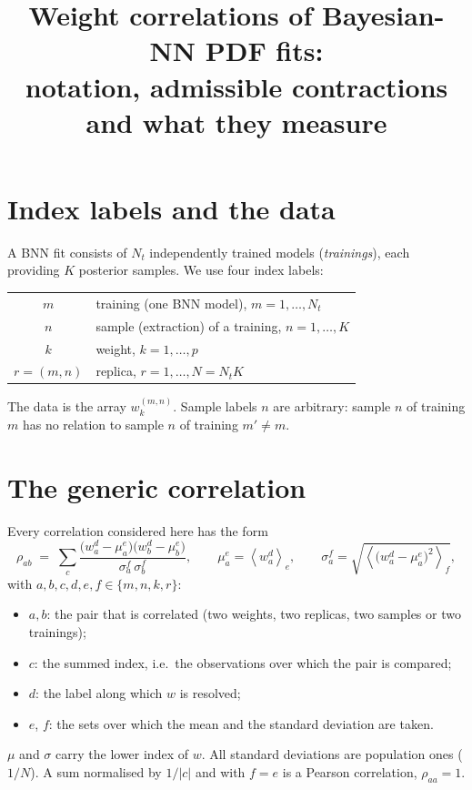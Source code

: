 \documentclass[11pt]{article}
\title{Weight correlations of Bayesian-NN PDF fits:\\ notation, admissible contractions and what they measure}
\author{}
\date{}
\newcommand{\avg}[2]{\left\langle #1 \right\rangle_{#2}}
\begin{document}
\maketitle

\section{Index labels and the data}
A BNN fit consists of $N_t$ independently trained models (\emph{trainings}), each providing $K$ posterior
samples. We use four index labels:
\begin{center}
\begin{tabular}{cl}
\toprule
$m$ & training (one BNN model), $m = 1,\dots,N_t$\\
$n$ & sample (extraction) of a training, $n = 1,\dots,K$\\
$k$ & weight, $k = 1,\dots,p$\\
$r = (m,n)$ & replica, $r = 1,\dots,N = N_t K$\\
\bottomrule
\end{tabular}
\end{center}
The data is the array $w_k^{(m,n)}$. Sample labels $n$ are arbitrary: sample $n$ of training $m$ has no
relation to sample $n$ of training $m' \neq m$.

\section{The generic correlation}
Every correlation considered here has the form
\begin{equation}
  \rho_{ab} \;=\; \sum_c \frac{\bigl(w_a^{d} - \mu_a^{e}\bigr)\bigl(w_b^{d} - \mu_b^{e}\bigr)}{\sigma_a^{f}\,\sigma_b^{f}},
  \qquad
  \mu_a^{e} = \avg{w_a^{d}}{e},\qquad
  \sigma_a^{f} = \sqrt{\avg{\bigl(w_a^{d}-\mu_a^{e}\bigr)^2}{f}},
  \label{eq:generic}
\end{equation}
with $a,b,c,d,e,f \in \{m,n,k,r\}$:
\begin{itemize}
  \item $a,b$: the pair that is correlated (two weights, two replicas, two samples or two trainings);
  \item $c$: the summed index, i.e.\ the observations over which the pair is compared;
  \item $d$: the label along which $w$ is resolved;
  \item $e$, $f$: the sets over which the mean and the standard deviation are taken.
\end{itemize}
$\mu$ and $\sigma$ carry the lower index of $w$. All standard deviations are population ones
($1/N$). A sum normalised by $1/|c|$ and with $f=e$ is a Pearson correlation, $\rho_{aa}=1$.
\end{document}
